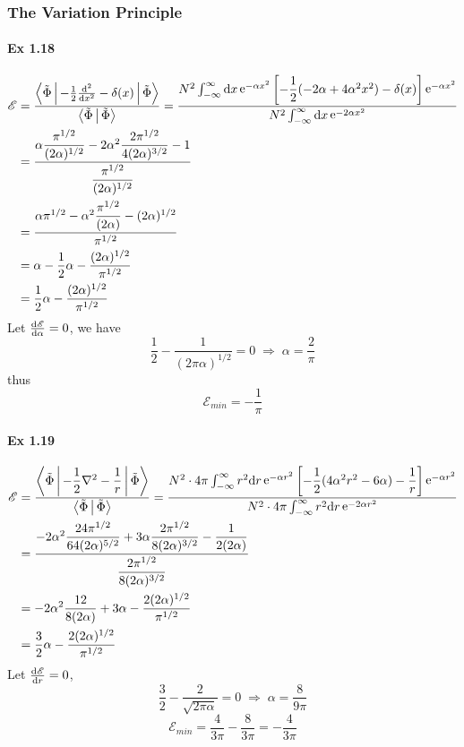 \documentclass[a4paper]{article}
\DeclareMathOperator{\intdinf}{\int_{-\infty}^\infty}
\DeclareMathOperator{\e}{\mathrm{e}}
\DeclareMathOperator{\dra}{\Rightarrow}
\newcommand{\ex}[1]{\paragraph{Ex #1}}
\numberwithin{equation}{subsection}
\begin{document}
\subsubsection{The Variation Principle}
\ex{1.18}
\begin{equation}\label{key}
\begin{aligned}
\mathscr{E} &= \dfrac{\Braket{\tilde{\Phi} | -\tfrac{1}{2}\dv[2]{x}-\delta(x) | \tilde{\Phi}}}{\Braket{\tilde{\Phi} | \tilde{\Phi}}} = \dfrac{N^2 \intdinf\dd x \e^{-\alpha x^2}\qty[-\dfrac{1}{2}(-2\alpha+4\alpha^2 x^2) - \delta(x)]\e^{-\alpha x^2}}{N^2\intdinf\dd x \e^{-2\alpha x^2}}\\
&= \dfrac{\alpha\dfrac{\pi^{1/2}}{(2\alpha)^{1/2}} - 2\alpha^2\dfrac{2\pi^{1/2}}{4(2\alpha)^{3/2}} - 1}{\dfrac{\pi^{1/2}}{(2\alpha)^{1/2}}}\\
&= \dfrac{\alpha \pi^{1/2} - \alpha^2\dfrac{\pi^{1/2}}{(2\alpha)} - (2\alpha)^{1/2}}{\pi^{1/2}}\\
&= \alpha - \dfrac{1}{2}\alpha - \dfrac{(2\alpha)^{1/2}}{\pi^{1/2}}\\
&= \dfrac{1}{2}\alpha - \dfrac{(2\alpha)^{1/2}}{\pi^{1/2}}
\end{aligned}
\end{equation}
Let $ \dv{\mathscr{E}}{\alpha} = 0 $, we have
\begin{equation}\label{key}
\dfrac{1}{2} - \dfrac{1}{(2\pi\alpha)^{1/2}} = 0 \;\dra\; \alpha = \dfrac{2}{\pi}
\end{equation}
thus
\begin{equation}\label{key}
\mathscr{E}_{min} = -\dfrac{1}{\pi}
\end{equation}

\ex{1.19}
\begin{equation}\label{key}
\begin{aligned}
\mathscr{E} &= \dfrac{\Braket{\tilde{\Phi} | -\dfrac{1}{2}\nabla^2 - \dfrac{1}{r} | \tilde{\Phi}}}{\Braket{\tilde{\Phi} | \tilde{\Phi}}} = \dfrac{N^2 \cdot 4\pi \intdinf r^2\dd r \e^{-\alpha r^2}\qty[-\dfrac{1}{2}(4 \alpha^2 r^2 - 6\alpha ) - \dfrac{1}{r}]\e^{-\alpha r^2}}{N^2\cdot 4\pi \intdinf r^2\dd r \e^{-2\alpha r^2}}\\
&= \dfrac{-2\alpha^2\dfrac{24\pi^{1/2}}{64(2\alpha)^{5/2}} + 3\alpha\dfrac{2\pi^{1/2}}{8(2\alpha)^{3/2}} - \dfrac{1}{2(2\alpha)} }{\dfrac{2\pi^{1/2}}{8(2\alpha)^{3/2}}}\\
&= -2\alpha^2\dfrac{12}{8(2\alpha)} + 3\alpha - \dfrac{2(2\alpha)^{1/2}}{\pi^{1/2} } \\
&= \dfrac{3}{2}\alpha - \dfrac{2(2\alpha)^{1/2}}{\pi^{1/2} }
\end{aligned}
\end{equation}
Let $ \dv{\mathscr{E}}{r} = 0 $,
\begin{equation}\label{key}
\dfrac{3}{2} - \dfrac{2}{\sqrt{2\pi\alpha}} = 0 \;\dra\; \alpha = \dfrac{8}{9\pi}
\end{equation}
\begin{equation}\label{key}
\mathscr{E}_{min} = \dfrac{4}{3\pi} - \dfrac{8}{3\pi} = -\dfrac{4}{3\pi}
\end{equation}
\end{document}
